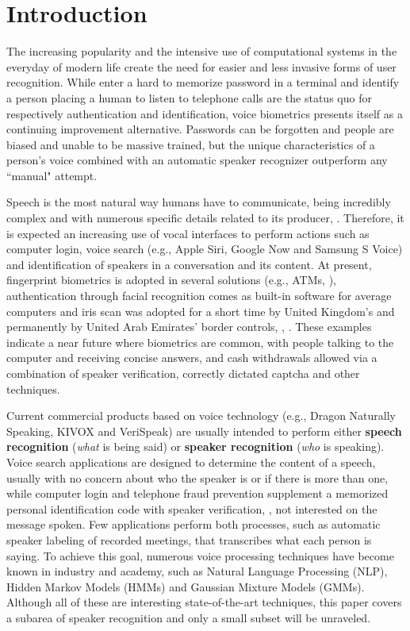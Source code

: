 \chapter{Introduction}
\label{ch:intro}

The increasing popularity and the intensive use of computational systems in the everyday of modern life create the need for easier and less invasive forms of user recognition. While enter a hard to memorize password in a terminal and identify a person placing a human to listen to telephone calls are the status quo for respectively authentication and identification, voice biometrics presents itself as a continuing improvement alternative. Passwords can be forgotten and people are biased and unable to be massive trained, but the unique characteristics of a person's voice combined with an automatic speaker recognizer outperform any ``manual" attempt.

Speech is the most natural way humans have to communicate, being incredibly complex and with numerous specific details related to its producer, . Therefore, it is expected an increasing use of vocal interfaces to perform actions such as computer login, voice search (e.g., Apple Siri, Google Now and Samsung S Voice) and identification of speakers in a conversation and its content. At present, fingerprint biometrics is adopted in several solutions (e.g., ATMs, ), authentication through facial recognition comes as built-in software for average computers and iris scan was adopted for a short time by United Kingdom's and permanently by United Arab Emirates' border controls, , . These examples indicate a near future where biometrics are common, with people talking to the computer and receiving concise answers, and cash withdrawals allowed via a combination of speaker verification, correctly dictated captcha and other techniques.

Current commercial products based on voice technology (e.g., Dragon Naturally Speaking, KIVOX and VeriSpeak) are usually intended to perform either \textbf{speech recognition} (\emph{what} is being said) or \textbf{speaker recognition} (\emph{who} is speaking). Voice search applications are designed to determine the content of a speech, usually with no concern about who the speaker is or if there is more than one, while computer login and telephone fraud prevention supplement a memorized personal identification code with speaker verification, , not interested on the message spoken. Few applications perform both processes, such as automatic speaker labeling of recorded meetings, that transcribes what each person is saying. To achieve this goal, numerous voice processing techniques have become known in industry and academy, such as Natural Language Processing (NLP), Hidden Markov Models (HMMs) and Gaussian Mixture Models (GMMs). Although all of these are interesting state-of-the-art techniques, this paper covers a subarea of speaker recognition and only a small subset will be unraveled.

